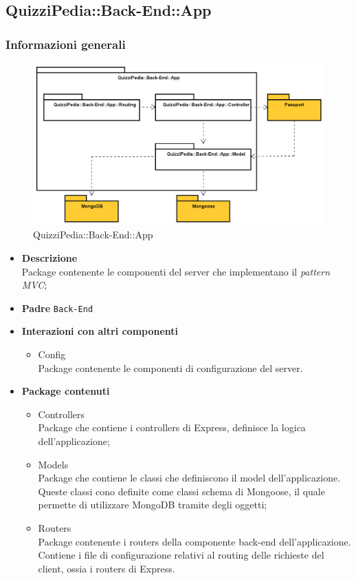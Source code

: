 \subsection{QuizziPedia::Back-End::App}
\subsubsection{Informazioni generali}
\label{QuizziPedia::Back-End::App}
\begin{figure}
	\centering
	\includegraphics[scale=0.45]{UML/Package/QuizziPedia_Back-End_App.png}
	\caption{QuizziPedia::Back-End::App}
\end{figure}
\FloatBarrier
	\begin{itemize}
		\item \textbf{Descrizione} \\
		Package contenente le componenti del server che implementano il \textit{pattern\ped{G} MVC};
		\item \textbf{Padre} \texttt{Back-End}
		\item \textbf{Interazioni con altri componenti}
			\begin{itemize}
				\item Config \\
				Package contenente le componenti di configurazione del server.
			\end{itemize}
		\item \textbf{Package contenuti}
			\begin{itemize}
				\item Controllers \\
				Package che contiene i controllers di Express, definisce la logica dell'applicazione;
				\item Models \\
				Package che contiene le classi che definiscono il model dell'applicazione. Queste classi cono definite come classi schema di Mongoose, il quale permette di utilizzare MongoDB tramite degli oggetti;
				\item Routers \\
				Package contenente i routers della componente back-end dell'applicazione. Contiene i file di configurazione relativi al routing delle richieste del client, ossia i routers di Express.
			\end{itemize}
	\end{itemize}